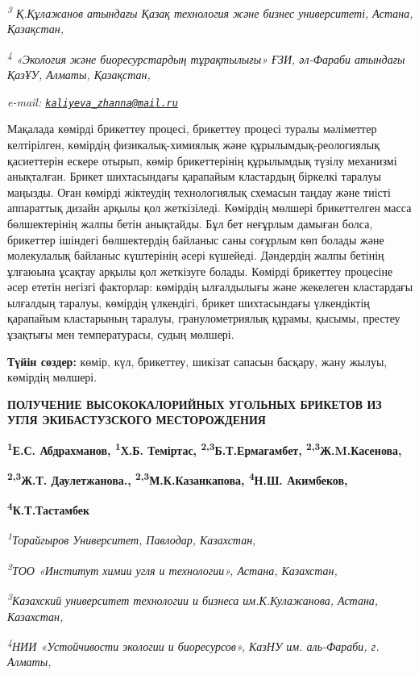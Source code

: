 \emph{\textsuperscript{3} Қ.Құлажанов атындағы Қазақ технология және
бизнес университеті, Астана, Қазақстан,}

\emph{\textsuperscript{4} «Экология және биоресурстардың тұрақтылығы»
ҒЗИ, әл-Фараби атындағы ҚазҰУ, Алматы, Қазақстан,}

\emph{e-mail:
\href{mailto:kaliyeva_zhanna@mail.ru}{\nolinkurl{kaliyeva\_zhanna@mail.ru}}}

Мақалада көмірді брикеттеу процесі, брикеттеу процесі туралы мәліметтер
келтірілген, көмірдің физикалық-химиялық және құрылымдық-реологиялық
қасиеттерін ескере отырып, көмір брикеттерінің құрылымдық түзілу
механизмі анықталған. Брикет шихтасындағы қарапайым кластардың біркелкі
таралуы маңызды. Оған көмірді жіктеудің технологиялық схемасын таңдау
және тиісті аппараттық дизайн арқылы қол жеткізіледі. Көмірдің мөлшері
брикеттелген масса бөлшектерінің жалпы бетін анықтайды. Бұл бет неғұрлым
дамыған болса, брикеттер ішіндегі бөлшектердің байланыс саны соғұрлым
көп болады және молекулалық байланыс күштерінің әсері күшейеді.
Дәндердің жалпы бетінің ұлғаюына ұсақтау арқылы қол жеткізуге болады.
Көмірді брикеттеу процесіне әсер ететін негізгі факторлар: көмірдің
ылғалдылығы және жекелеген кластардағы ылғалдың таралуы, көмірдің
үлкендігі, брикет шихтасындағы үлкендіктің қарапайым кластарының
таралуы, гранулометриялық құрамы, қысымы, престеу ұзақтығы мен
температурасы, судың мөлшері.

{\bfseries Түйін сөздер:} көмір, күл, брикеттеу, шикізат сапасын басқару,
жану жылуы, көмірдің мөлшері.

{\bfseries ПОЛУЧЕНИЕ ВЫСОКОКАЛОРИЙНЫХ УГОЛЬНЫХ БРИКЕТОВ ИЗ УГЛЯ
ЭКИБАСТУЗСКОГО МЕСТОРОЖДЕНИЯ}

{\bfseries \textsuperscript{1}Е.С. Абдрахманов, \textsuperscript{1}Х.Б.
Теміртас, \textsuperscript{2,3}Б.Т.Ермагамбет,
\textsuperscript{2,3}Ж.M.Касенова,}

{\bfseries \textsuperscript{2,3}Ж.Т. Даулетжанова.,
\textsuperscript{2,3}М.К.Казанкапова, \textsuperscript{4}Н.Ш.
Акимбеков,}

{\bfseries \textsuperscript{4}К.Т.Тастамбек}

\emph{\textsuperscript{1}Торайгыров Университет, Павлодар, Казахстан,}

\emph{\textsuperscript{2}ТОО «Институт химии угля и технологии», Астана,
Казахстан,}

\emph{\textsuperscript{3}Казахский университет технологии и бизнеса
им.К.Кулажанова, Астана, Казахстан,}

\emph{\textsuperscript{4}НИИ «Устойчивости экологии и биоресурсов»,
КазНУ им. аль-Фараби, г. Алматы,}

